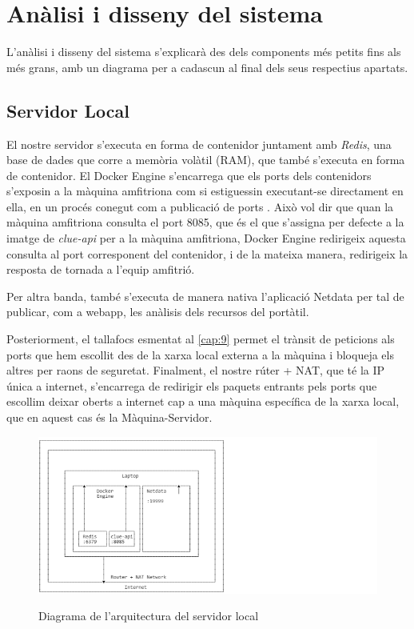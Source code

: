 \chapter{Anàlisi i disseny del sistema}

L'anàlisi i disseny del sistema s'explicarà des dels components més petits fins als més grans, amb un diagrama per a cadascun al final dels seus respectius apartats.

\section{Servidor Local}

El nostre servidor s'executa en forma de contenidor juntament amb \textit{Redis}, una base de dades que corre a memòria volàtil (RAM), que també s'executa en forma de contenidor. El Docker Engine s'encarrega que els ports dels contenidors s'exposin a la màquina amfitriona com si estiguessin executant-se directament en ella, en un procés conegut com a publicació de ports \cite{noauthor_publishing_0100}. Això vol dir que quan la màquina amfitriona consulta el port 8085, que és el que s'assigna per defecte a la imatge de \textit{clue-api} per a la màquina amfitriona, Docker Engine redirigeix aquesta consulta al port corresponent del contenidor, i de la mateixa manera, redirigeix la resposta de tornada a l'equip amfitrió.

Per altra banda, també s'executa de manera nativa l'aplicació Netdata per tal de publicar, com a webapp, les anàlisis dels recursos del portàtil.

Posteriorment, el tallafocs esmentat al \autoref{cap:9} permet el trànsit de peticions als ports que hem escollit des de la xarxa local externa a la màquina i bloqueja els altres per raons de seguretat. Finalment, el nostre rúter + NAT, que té la IP única a internet, s'encarrega de redirigir els paquets entrants pels ports que escollim deixar oberts a internet cap a una màquina específica de la xarxa local, que en aquest cas és la Màquina-Servidor.

\begin{figure}[!htbp] \includegraphics[width=1.75\textwidth]{Imatges/Server-Local.png} \label{fig:ServerLocal
} \caption{Diagrama de l'arquitectura del servidor local} \end{figure}

